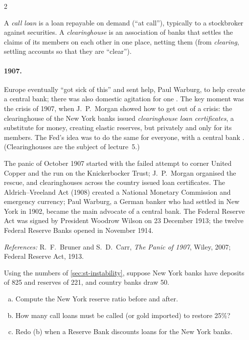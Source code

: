 \begin{paracol}{2}
\begin{taccts}
\quad
{}
\end{taccts}

\begin{definition}
A \emph{call loan} is a loan repayable on demand (``at call''), typically to a stockbroker against securities. A \emph{clearinghouse} is an
association of banks that settles the claims of its members on each other in one place, netting them (from \emph{clearing}, settling
accounts so that they are ``clear'').
\end{definition}

\paragraph{1907.} Europe eventually ``got sick of this'' and sent help, Paul Warburg, to help create a central bank; there was also
domestic agitation for one . The key moment was the crisis of 1907, when J.~P.~Morgan showed how to get out of a crisis:
the clearinghouse of the New York banks issued \emph{clearinghouse loan certificates}, a substitute for money, creating elastic reserves,
but privately and only for its members. The Fed's idea was to do the same for everyone, with a central bank .
(Clearinghouses are the subject of lecture~5.)\begin{history}[From 1907 to 1913]
The panic of October 1907 started with the failed attempt to corner United Copper and the run on the Knickerbocker Trust; J.~P.~Morgan
organised the rescue, and clearinghouses across the country issued loan certificates. The Aldrich--Vreeland Act (1908) created a National
Monetary Commission and emergency currency; Paul Warburg, a German banker who had settled in New York in 1902, became the main advocate of a
central bank. The Federal Reserve Act was signed by President Woodrow Wilson on 23 December 1913; the twelve Federal Reserve Banks opened in
November 1914.\par
\emph{References:} R.~F.~Bruner and S.~D.~Carr, \emph{The Panic of 1907}, Wiley, 2007; Federal Reserve Act, 1913.
\end{history}

\begin{exercise}
Using the numbers of \cref{sec:st-instability}, suppose New York banks have deposits of 825 and reserves of 221, and country banks draw 50.
\begin{enumerate}[(a)]
  \item Compute the New York reserve ratio before and after.
  \item How many call loans must be called (or gold imported) to restore 25\%?
  \item Redo (b) when a Reserve Bank discounts loans for the New York banks.
\end{enumerate}
\end{exercise}


\end{paracol}
